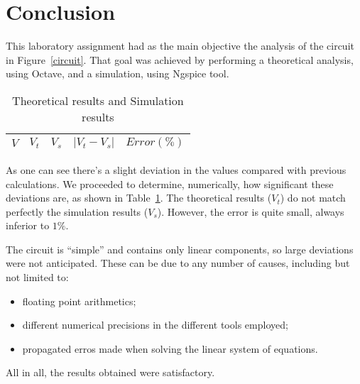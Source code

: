 \section{Conclusion}
\label{sec:conclusion}

This laboratory assignment had as the main objective the analysis of the circuit in Figure~\ref{circuit}. That goal was achieved by performing a theoretical analysis, using Octave, and a simulation, using Ngspice tool.

\begin{table}[H]
  \centering
  \begin{tabular}{|c|c|c|c|c|}
    \hline
        $V$ & $V_t$ & $V_s$ & $|V_t-V_s|$ & $Error (\%)$\footnotemark \\
        \hline
        \hline
        
        \hline
  \end{tabular}
  \caption{Theoretical results and Simulation results}
  \label{error_res}
\end{table}


\newpage

As one can see there's a slight deviation in the values compared with previous calculations. We proceeded to determine, numerically, how significant these deviations are, as shown in Table~\ref{error_res}. The theoretical results ($V_t$) do not match perfectly the simulation results ($V_s$). However, the error is quite small, always inferior to $1\%$.

The circuit is ``simple'' and contains only linear components, so large deviations were not anticipated. These can be due to any number of causes, including but not limited to:

\begin{itemize}
\item floating point arithmetics;
\item different numerical precisions in the different tools employed;
\item propagated erros made when solving the linear system of equations.
\end{itemize}



All in all, the results obtained were satisfactory.


